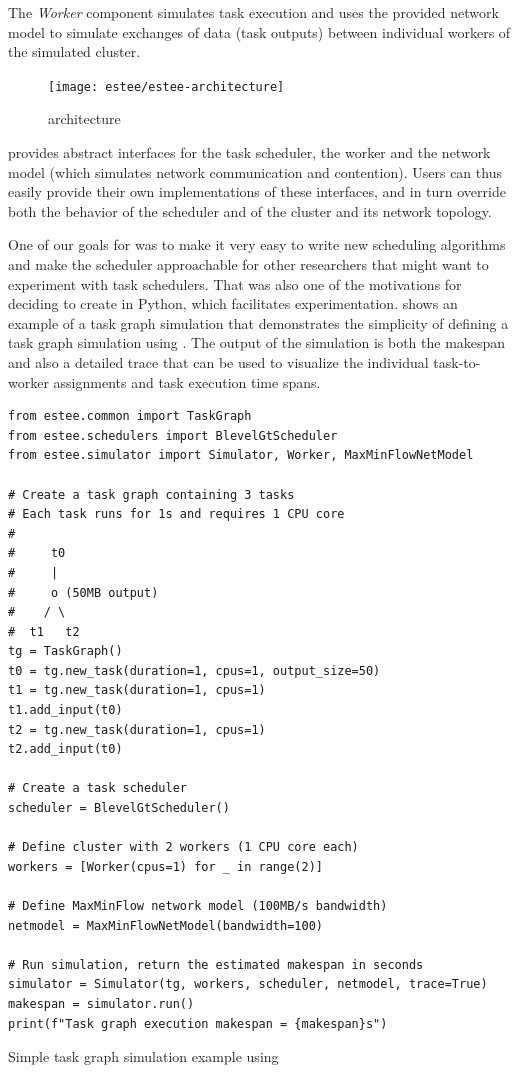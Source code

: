 The \emph{Worker} component simulates task execution and uses the provided network model to simulate exchanges of data (task
outputs) between individual workers of the simulated cluster.

\begin{figure}
	\centering
	\texttt{[image: estee/estee-architecture]}
	\caption{\estee{} architecture}
	\label{fig:estee-architecture}
\end{figure}

\estee{} provides abstract interfaces for the task scheduler, the worker and the
network model (which simulates network communication and contention). Users can thus easily provide
their own implementations of these interfaces, and in turn override both the behavior of the
scheduler and of the cluster and its network topology.

One of our goals for \estee{} was to make it very easy to write new scheduling
algorithms and make the scheduler approachable for other researchers that might want to experiment
with task schedulers. That was also one of the motivations for deciding to create
\estee{} in Python, which facilitates experimentation.  shows
an example of a task graph simulation that demonstrates the simplicity of defining a task graph
simulation using \estee{}. The output of the simulation is both the makespan and
also a detailed trace that can be used to visualize the individual task-to-worker assignments and
task execution time spans.

\begin{listing}
	\begin{verbatim}
from estee.common import TaskGraph
from estee.schedulers import BlevelGtScheduler
from estee.simulator import Simulator, Worker, MaxMinFlowNetModel

# Create a task graph containing 3 tasks
# Each task runs for 1s and requires 1 CPU core
#
#     t0
#     |
#     o (50MB output)
#    / \
#  t1   t2
tg = TaskGraph()
t0 = tg.new_task(duration=1, cpus=1, output_size=50)
t1 = tg.new_task(duration=1, cpus=1)
t1.add_input(t0)
t2 = tg.new_task(duration=1, cpus=1)
t2.add_input(t0)

# Create a task scheduler
scheduler = BlevelGtScheduler()

# Define cluster with 2 workers (1 CPU core each)
workers = [Worker(cpus=1) for _ in range(2)]

# Define MaxMinFlow network model (100MB/s bandwidth)
netmodel = MaxMinFlowNetModel(bandwidth=100)

# Run simulation, return the estimated makespan in seconds
simulator = Simulator(tg, workers, scheduler, netmodel, trace=True)
makespan = simulator.run()
print(f"Task graph execution makespan = {makespan}s")
    \end{verbatim}
	\caption{Simple task graph simulation example using \estee{}}
	\label{lst:estee-example}
\end{listing}

